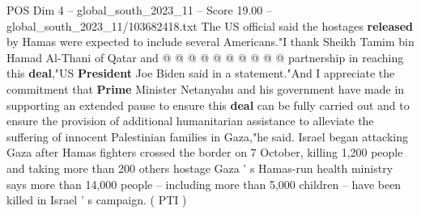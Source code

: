 \begin{textsample}{POS Dim 4 – global\_south\_2023\_11 – Score 19.00 – global\_south\_2023\_11/103682418.txt}
The US official said the hostages \textbf{released} by Hamas were expected to include several Americans."I thank Sheikh Tamim bin Hamad Al-Thani of Qatar and @ @ @ @ @ @ @ @ @ @ partnership in reaching this \textbf{deal},"US \textbf{President} Joe Biden said in a statement."And I appreciate the commitment that \textbf{Prime} Minister Netanyahu and his government have made in supporting an extended pause to ensure this \textbf{deal} can be fully carried out and to ensure the provision of additional humanitarian assistance to alleviate the suffering of innocent Palestinian families in Gaza,"he said.
Israel began attacking Gaza after Hamas fighters crossed the border on 7 October, killing 1,200 people and taking more than 200 others hostage Gaza ' s Hamas-run health ministry says more than 14,000 people -- including more than 5,000 children -- have been killed in Israel ' s campaign. ( PTI )

\end{textsample}
